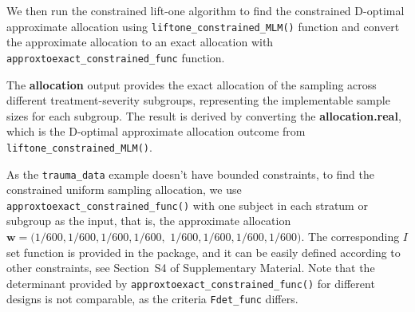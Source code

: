 We then run the constrained lift-one algorithm to find the constrained D-optimal approximate allocation using \texttt{liftone\_constrained\_MLM()} function and convert the approximate allocation to an exact allocation with \texttt{approxtoexact\_constrained\_func} function.

The \textbf{allocation} output provides the exact allocation of the sampling across different treatment-severity subgroups, representing the implementable sample sizes for each subgroup. The result is derived by converting the \textbf{allocation.real}, which is the D-optimal approximate allocation outcome from \texttt{liftone\_constrained\_MLM()}.

 As the \texttt{trauma\_data} example doesn't have bounded constraints,  to find the constrained uniform sampling allocation, we use \texttt{approxtoexact\_constrained\_func()} with one subject in each stratum or subgroup as the input, that is, the approximate allocation $\mathbf w = (1/600, 1/600, 1/600, 1/600,$ $1/600, 1/600, 1/600, 1/600)$. The corresponding $I$ set function is provided in the  package, and it can be easily defined according to other constraints, see Section~S4 of Supplementary Material. Note that the determinant provided by \texttt{approxtoexact\_constrained\_func()} for different designs is not comparable, as the criteria \texttt{Fdet\_func} differs.

